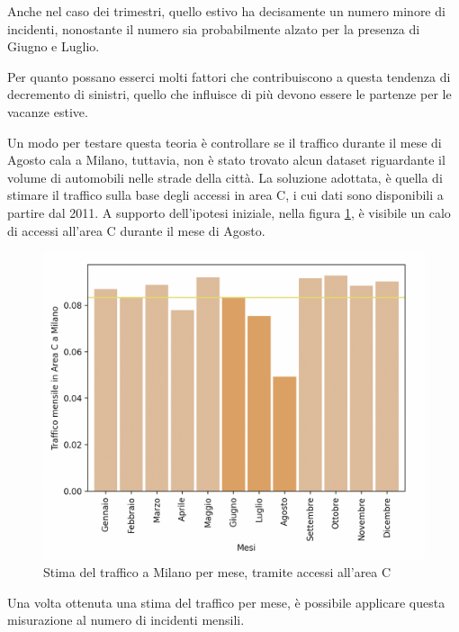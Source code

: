 \documentclass[a4paper]{report}
\begin{document}
Anche nel caso dei trimestri, quello estivo ha decisamente un numero minore di incidenti, 
nonostante il numero sia probabilmente alzato per la presenza di Giugno e Luglio.

Per quanto possano esserci molti fattori che contribuiscono a questa tendenza di decremento di sinistri, 
quello che influisce di più devono essere le partenze per le vacanze estive.

Un modo per testare questa teoria è controllare se il traffico durante il mese di Agosto cala a Milano, 
tuttavia, non è stato trovato alcun dataset riguardante il volume di automobili nelle strade della città.
La soluzione adottata, è quella di stimare il traffico sulla base degli accessi in area C, i cui dati 
sono disponibili a partire dal 2011.
A supporto dell'ipotesi iniziale, nella figura \ref{fig:stima-traffico-mensile}, 
è visibile un calo di accessi all'area C durante il mese di Agosto.

\begin{figure}
    \includegraphics[width=\linewidth]{../src/area_c/stima_traffico_mensile.png}
    \caption{Stima del traffico a Milano per mese, tramite accessi all'area C}
    \label{fig:stima-traffico-mensile}
\end{figure}

Una volta ottenuta una stima del traffico per mese, è possibile applicare questa misurazione 
al numero di incidenti mensili.
\end{document}
